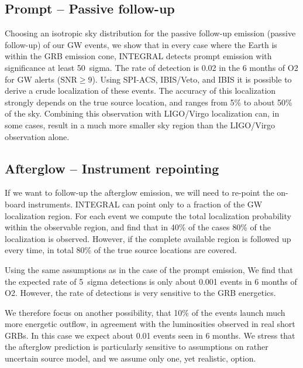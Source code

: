\documentclass[11pt]{article}
\begin{document}
\subsection*{Prompt -- Passive follow-up}

Choosing an isotropic sky distribution for the passive follow-up emission
(passive follow-up) of our GW events, we show that in every case where the Earth
is within the GRB emission cone, INTEGRAL detects prompt emission with
significance at least 50~sigma.  The rate of detection is 0.02 in the 6 months
of O2 for GW alerts ($\mathrm{SNR} \geq 9$). Using SPI-ACS, IBIS/Veto, and IBIS
it is possible to derive a crude localization of these events. The accuracy of
this localization strongly depends on the true source location, and ranges from
5\% to about 50\% of the sky. Combining this observation with LIGO/Virgo
localization can, in some cases, result in a much more smaller sky region than
the LIGO/Virgo observation alone.

\subsection*{Afterglow -- Instrument repointing}

If we want to follow-up the afterglow emission, we will need to re-point the
on-board instruments.  INTEGRAL can point only to a fraction of the GW
localization region. For each event we compute the total localization
probability within the observable region, and find that in 40\% of the cases
80\% of the localization is observed. However, if the complete available region
is followed up every time, in total 80\% of the true source locations are
covered.

Using the same assumptions as in the case of the prompt emission, We find that
the expected rate of 5~sigma detections is only about 0.001 events in 6 months
of O2. However, the rate of detections is very sensitive to the GRB energetics.

We therefore focus on another possibility, that 10\% of the events launch much
more energetic outflow, in agreement with the luminosities observed in real
short GRBs. In this case we expect about 0.01 events seen in 6 months. We
stress that the afterglow prediction is particularly sensitive to assumptions on
rather uncertain source model, and we assume only one, yet realistic, option.

\end{document}

